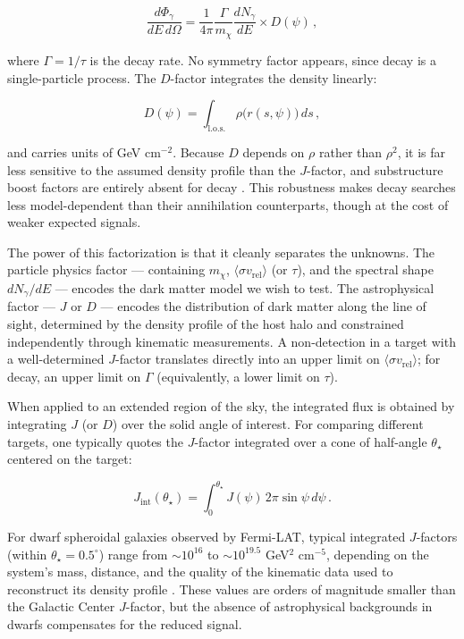 \begin{equation}
	\frac{d\Phi_\gamma}{dE\, d\Omega} = \frac{1}{4\pi} \frac{\Gamma}{m_\chi} \frac{dN_\gamma}{dE} \times D(\psi) \,,
	\label{eq:flux_dec}
\end{equation}

where $\Gamma = 1/\tau$ is the decay rate.
No symmetry factor appears, since decay is a single-particle process.
The $D$-factor integrates the density linearly:

\begin{equation}
	D(\psi) = \int_\text{l.o.s.} \rho\bigl(r(s, \psi)\bigr) \, ds \,,
	\label{eq:dfactor}
\end{equation}

and carries units of GeV cm$^{-2}$.
Because $D$ depends on $\rho$ rather than $\rho^2$, it is far less sensitive to the assumed density profile than the $J$-factor, and substructure boost factors are entirely absent for decay \cite{Cirelli:2024ssz}.
This robustness makes decay searches less model-dependent than their annihilation counterparts, though at the cost of weaker expected signals.

The power of this factorization is that it cleanly separates the unknowns.
The particle physics factor --- containing $m_\chi$, $\langle \sigma v_\text{rel} \rangle$ (or $\tau$), and the spectral shape $dN_\gamma/dE$ --- encodes the dark matter model we wish to test.
The astrophysical factor --- $J$ or $D$ --- encodes the distribution of dark matter along the line of sight, determined by the density profile of the host halo and constrained independently through kinematic measurements.
A non-detection in a target with a well-determined $J$-factor translates directly into an upper limit on $\langle \sigma v_\text{rel} \rangle$; for decay, an upper limit on $\Gamma$ (equivalently, a lower limit on $\tau$).

When applied to an extended region of the sky, the integrated flux is obtained by integrating $J$ (or $D$) over the solid angle of interest.
For comparing different targets, one typically quotes the $J$-factor integrated over a cone of half-angle $\theta_\star$ centered on the target:

\begin{equation}
	J_\text{int}(\theta_\star) = \int_0^{\theta_\star} J(\psi) \, 2\pi \sin\psi \, d\psi \,.
	\label{eq:jfactor_int}
\end{equation}

For dwarf spheroidal galaxies observed by Fermi-LAT, typical integrated $J$-factors (within $\theta_\star = 0.5^\circ$) range from $\sim 10^{16}$ to $\sim 10^{19.5}$ GeV$^2$ cm$^{-5}$, depending on the system's mass, distance, and the quality of the kinematic data used to reconstruct its density profile \cite{Hooper:2024,Cirelli:2024ssz,Bonnivard:2015xpq}.
These values are orders of magnitude smaller than the Galactic Center $J$-factor, but the absence of astrophysical backgrounds in dwarfs compensates for the reduced signal.

